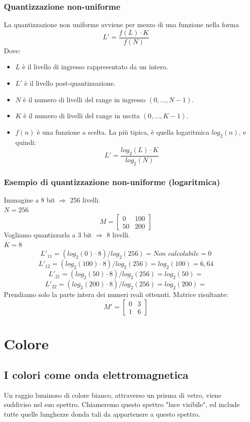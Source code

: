\documentclass{report}
\begin{document}
	\subsection{Quantizzazione non-uniforme}
	La quantizzazione non uniforme avviene per mezzo di una funzione nella forma
	$$
	L' = \frac{f(L) \cdot K}{f(N)}
	$$
	Dove:
	\begin{itemize}
		\item $L$ è il livello di ingresso rappresentato da un intero.
		\item $L'$ è il livello post-quantizzazione.
		\item $N$ è il numero di livelli del range in ingresso $(0, ..., N-1)$.
		\item $K$ è il numero di livelli del range in uscita $(0, ..., K-1)$.
		\item $f(n)$ è una funzione a scelta. La più tipica, è quella logaritmica $log_2(n)$, e quindi:
		      $$
		      L' = \frac{log_2(L) \cdot K}{log_2(N)}
		      $$
	\end{itemize}
		
		
		
	\subsection{Esempio di quantizzazione non-uniforme (logaritmica)}
	Immagine a 8 bit $\Rightarrow$ 256 livelli.\\
	$N = 256$
	$$
	M = 
	\begin{bmatrix}
		0  & 100 \\
		50 & 200 
	\end{bmatrix}
	$$
	Vogliamo quantizzarla a 3 bit $\Rightarrow$ 8 livelli.\\
	$K = 8$
	$$
	L'_{11} = (log_2(0) \cdot 8)/log_2(256) = \textit{Non calcolabile} = 0
	$$
	$$
	L'_{12} = (log_2(100) \cdot 8)/log_2(256) = log_2(100) = 6,64
	$$
	$$
	L'_{21} = (log_2(50) \cdot 8)/log_2(256) = log_2(50) =
	$$
	$$
	L'_{22} = (log_2(200) \cdot 8)/log_2(256) = log_2(200) =
	$$
	Prendiamo solo la parte intera dei numeri reali ottenuti. Matrice risultante:
	$$
	M' = 
	\begin{bmatrix}
		0 & 3 \\
		1 & 6 
	\end{bmatrix}
	$$
	\newpage
	\chapter{Colore}
	\section{I colori come onda elettromagnetica}
	Un raggio luminoso di colore bianco, attraverso un prisma di vetro, viene suddiviso nel suo spettro. Chiameremo questo spettro "luce visibile", ed include tutte quelle lunghezze donda tali da appartenere a questo spettro.
\end{document}

